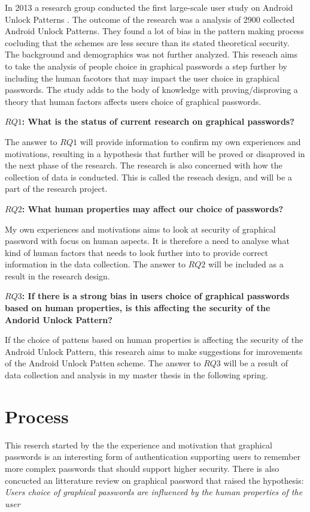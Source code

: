   In 2013 a research group conducted the first large-scale user study on Android Unlock Patterns \cite{Uellenbeck}. The outcome of the research was a analysis of 2900 collected Android Unlock Patterns. They found a lot of bias in the pattern making process cocluding that the schemes are less secure than its stated theoretical security. The background and demographics was not further analyzed. This reseach aims to take the analysis of people choice in graphical passwords a step further by including the human facotors that may impact the user choice in graphical passwords. The study adds to the body of knowledge with proving/disproving a theory that human factors affects users choice of graphical passwords. 

  {\bf $RQ1$: What is the status of current research on graphical passwords?}

  The answer to $RQ1$ will provide information to confirm my own experiences and motivations, resulting in a hypothesis that further will be proved or disaproved in the next phase of the research. 
  The research is also concerned with how the collection of data is conducted. This is called the reseach design, and will be a part of the research project. 
  
  {\bf $RQ2$: What human properties may affect our choice of passwords?}

  My own experiences and motivations aims to look at security of graphical password with focus on human aspects. It is therefore a need to analyse what kind of human factors that needs to look further into to provide correct information in the data collection. The answer to $RQ2$ will be included as a result in the research design.

  {\bf $RQ3$: If there is a strong bias in users choice of graphical passwords based on human properties, is this affecting the security of the Andorid Unlock Pattern?}

  If the choice of pattens based on human properties is affecting the security of the Android Unlock Pattern, this research aims to make suggestions for imrovements of the Android Unlock Patten scheme. The answer to $RQ3$ will be a result of data collection and analysis in my master thesis in the following spring. 


  \section*{Process}
  This reserch started by the the experience and motivation that graphical passwords is an interesting form of authentication supporting users to remember more complex passwords that should support higher security. There is also concucted an litterature review on graphical password that raised the hypothesis: {\it Users choice of graphical passwords are influenced by the human properties of the user}

